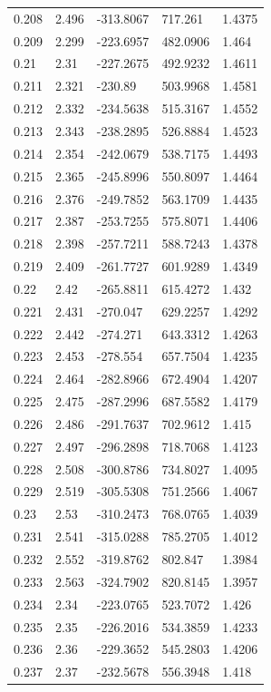 \begin{tabular}{lllll}
0.208 & 2.496 & -313.8067 & 717.261 & 1.4375 \\
0.209 & 2.299 & -223.6957 & 482.0906 & 1.464 \\
0.21 & 2.31 & -227.2675 & 492.9232 & 1.4611 \\
0.211 & 2.321 & -230.89 & 503.9968 & 1.4581 \\
0.212 & 2.332 & -234.5638 & 515.3167 & 1.4552 \\
0.213 & 2.343 & -238.2895 & 526.8884 & 1.4523 \\
0.214 & 2.354 & -242.0679 & 538.7175 & 1.4493 \\
0.215 & 2.365 & -245.8996 & 550.8097 & 1.4464 \\
0.216 & 2.376 & -249.7852 & 563.1709 & 1.4435 \\
0.217 & 2.387 & -253.7255 & 575.8071 & 1.4406 \\
0.218 & 2.398 & -257.7211 & 588.7243 & 1.4378 \\
0.219 & 2.409 & -261.7727 & 601.9289 & 1.4349 \\
0.22 & 2.42 & -265.8811 & 615.4272 & 1.432 \\
0.221 & 2.431 & -270.047 & 629.2257 & 1.4292 \\
0.222 & 2.442 & -274.271 & 643.3312 & 1.4263 \\
0.223 & 2.453 & -278.554 & 657.7504 & 1.4235 \\
0.224 & 2.464 & -282.8966 & 672.4904 & 1.4207 \\
0.225 & 2.475 & -287.2996 & 687.5582 & 1.4179 \\
0.226 & 2.486 & -291.7637 & 702.9612 & 1.415 \\
0.227 & 2.497 & -296.2898 & 718.7068 & 1.4123 \\
0.228 & 2.508 & -300.8786 & 734.8027 & 1.4095 \\
0.229 & 2.519 & -305.5308 & 751.2566 & 1.4067 \\
0.23 & 2.53 & -310.2473 & 768.0765 & 1.4039 \\
0.231 & 2.541 & -315.0288 & 785.2705 & 1.4012 \\
0.232 & 2.552 & -319.8762 & 802.847 & 1.3984 \\
0.233 & 2.563 & -324.7902 & 820.8145 & 1.3957 \\
0.234 & 2.34 & -223.0765 & 523.7072 & 1.426 \\
0.235 & 2.35 & -226.2016 & 534.3859 & 1.4233 \\
0.236 & 2.36 & -229.3652 & 545.2803 & 1.4206 \\
0.237 & 2.37 & -232.5678 & 556.3948 & 1.418 \\

\end{tabular}
